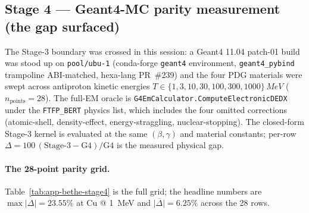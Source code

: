 \subsection{Stage 4 --- Geant4-MC parity measurement (the gap surfaced)}
\label{app:bethe-stage4}

The Stage-3 boundary was crossed in this session: a Geant4 11.04
patch-01 build was stood up on \texttt{pool/ubu-1} (conda-forge
\texttt{geant4} environment, \texttt{geant4\_pybind} trampoline
ABI-matched, hexa-lang PR~\#239) and the four PDG materials were swept
across antiproton kinetic energies
$T\in\{1,3,10,30,100,300,1000\}\,\si{MeV}$
($n_{\text{points}}=28$). The full-EM oracle is
\texttt{G4EmCalculator.ComputeElectronicDEDX} under the
\texttt{FTFP\_BERT} physics list, which includes the four omitted
corrections (atomic-shell, density-effect, energy-straggling,
nuclear-stopping). The closed-form Stage-3 kernel is evaluated at the
same $(\beta,\gamma)$ and material constants; per-row
$\Delta\!=\!100\,(\text{Stage-3} - \text{G4})/\text{G4}$ is the measured
physical gap.

\paragraph{The 28-point parity grid.} Table~\ref{tab:app-bethe-stage4}
is the full grid; the headline numbers are
$\max|\Delta|\!=\!23.55\%$ at Cu @ \SI{1}{MeV}
and $\overline{|\Delta|}\!=\!6.25\%$ across the 28 rows.

